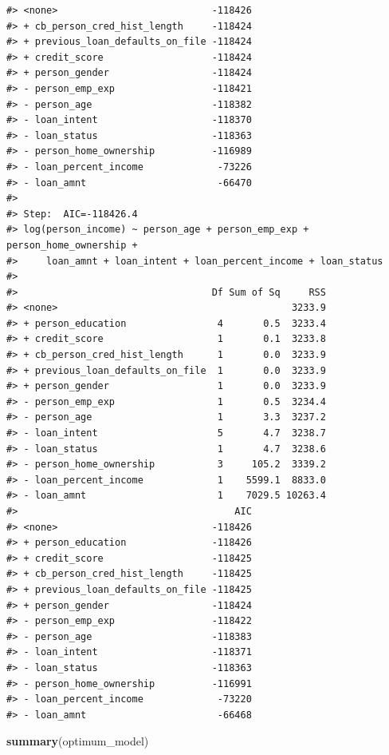 \documentclass[
  10pt,
]{article}
\newenvironment{Shaded}{\begin{snugshade}}{\end{snugshade}}
\newcommand{\FunctionTok}[1]{\textcolor[rgb]{0.13,0.29,0.53}{\textbf{#1}}}
\newcommand{\NormalTok}[1]{#1}
\begin{document}
\begin{verbatim}
#> <none>                           -118426
#> + cb_person_cred_hist_length     -118424
#> + previous_loan_defaults_on_file -118424
#> + credit_score                   -118424
#> + person_gender                  -118424
#> - person_emp_exp                 -118421
#> - person_age                     -118382
#> - loan_intent                    -118370
#> - loan_status                    -118363
#> - person_home_ownership          -116989
#> - loan_percent_income             -73226
#> - loan_amnt                       -66470
#> 
#> Step:  AIC=-118426.4
#> log(person_income) ~ person_age + person_emp_exp + person_home_ownership + 
#>     loan_amnt + loan_intent + loan_percent_income + loan_status
#> 
#>                                  Df Sum of Sq     RSS
#> <none>                                         3233.9
#> + person_education                4       0.5  3233.4
#> + credit_score                    1       0.1  3233.8
#> + cb_person_cred_hist_length      1       0.0  3233.9
#> + previous_loan_defaults_on_file  1       0.0  3233.9
#> + person_gender                   1       0.0  3233.9
#> - person_emp_exp                  1       0.5  3234.4
#> - person_age                      1       3.3  3237.2
#> - loan_intent                     5       4.7  3238.7
#> - loan_status                     1       4.7  3238.6
#> - person_home_ownership           3     105.2  3339.2
#> - loan_percent_income             1    5599.1  8833.0
#> - loan_amnt                       1    7029.5 10263.4
#>                                      AIC
#> <none>                           -118426
#> + person_education               -118426
#> + credit_score                   -118425
#> + cb_person_cred_hist_length     -118425
#> + previous_loan_defaults_on_file -118425
#> + person_gender                  -118424
#> - person_emp_exp                 -118422
#> - person_age                     -118383
#> - loan_intent                    -118371
#> - loan_status                    -118363
#> - person_home_ownership          -116991
#> - loan_percent_income             -73220
#> - loan_amnt                       -66468
\end{verbatim}

\begin{Shaded}
\begin{Highlighting}[]
\FunctionTok{summary}\NormalTok{(optimum\_model)}
\end{Highlighting}
\end{Shaded}
\end{document}
